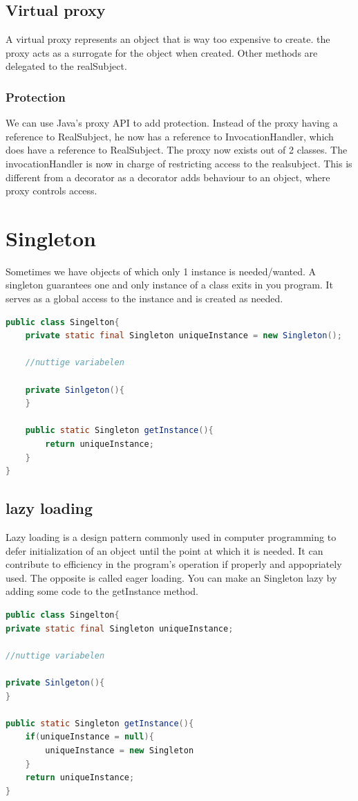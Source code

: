 \documentclass{report}
\begin{document}
		\section{Virtual proxy}
			A virtual proxy represents an object that is way too expensive to create. the proxy acts as a surrogate for the object when created. Other methods are delegated to the realSubject.
			\subsection{Protection}
				We can use Java's proxy API to add protection. Instead of the proxy having a reference to RealSubject, he now has a reference to InvocationHandler, which does have a reference to RealSubject. The proxy now exists out of 2 classes. The invocationHandler is now in charge of restricting access to the realsubject. This is different from a decorator as a decorator adds behaviour to an object, where proxy controls access.
	\chapter{Singleton}
		Sometimes we have objects of which only 1 instance is needed/wanted. A singleton guarantees one and only instance of a class exits in you program. It serves as a global access to the instance and is created as needed.
		\begin{lstlisting}[language = java]
public class Singelton{
	private static final Singleton uniqueInstance = new Singleton();
	
	//nuttige variabelen
	
	private Sinlgeton(){
	}
	
	public static Singleton getInstance(){
		return uniqueInstance;
	}
}\end{lstlisting}
		\section{lazy loading}
			Lazy loading is a design pattern commonly used in computer programming to defer initialization of an object until the point at which it is needed. It can contribute to efficiency in the program's operation if properly and appopriately used. The opposite is called eager loading. You can make an Singleton lazy by adding some code to the getInstance method.
			\begin{lstlisting}[language = java]
public class Singelton{
private static final Singleton uniqueInstance;

//nuttige variabelen

private Sinlgeton(){
}

public static Singleton getInstance(){
	if(uniqueInstance = null){
		uniqueInstance = new Singleton
	}
	return uniqueInstance;
}\end{lstlisting}
\end{document}
